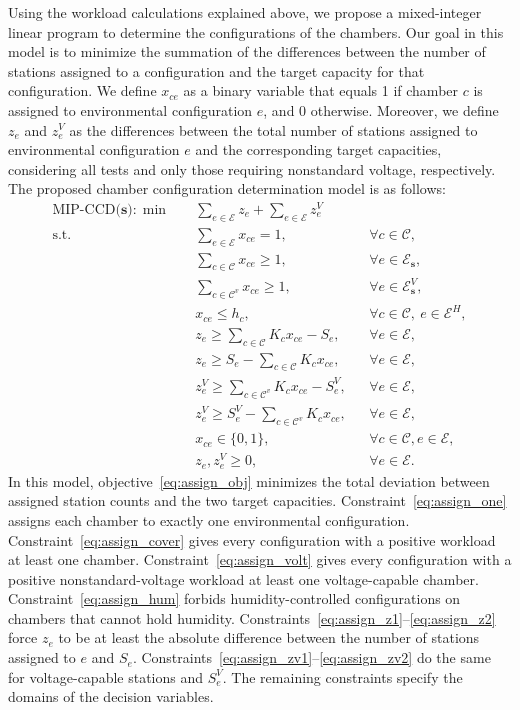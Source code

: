 \documentclass[11pt]{article}
\begin{document}
Using the workload calculations explained above, we propose a mixed-integer linear program to determine the configurations of the chambers. Our goal in this model is to minimize the summation of the differences between the number of stations assigned to a configuration and the target capacity for that configuration. We define \(x_{ce}\) as a binary variable that equals 1 if chamber \(c\) is assigned to environmental configuration \(e\), and 0 otherwise. Moreover, we define \(z_e\) and \(z_e^V\) as the differences between the total number of stations assigned to environmental configuration \(e\) and the corresponding target capacities, considering all tests and only those requiring nonstandard voltage, respectively.
The proposed chamber configuration determination model is as follows:
\begin{align}
\textrm{MIP-CCD($\mathbf{s}$)}: \min\quad
& \sum_{e\in\mathcal{E}}z_e+\sum_{e\in\mathcal{E}}z_e^V
\label{eq:assign_obj}\\
\text{s.t.}\quad
& \sum_{e\in\mathcal{E}}x_{ce}=1,
&& \forall c\in\mathcal{C},
\label{eq:assign_one}\\
& \sum_{c\in\mathcal{C}}x_{ce}\ge 1,
&& \forall e\in\mathcal{E}_\mathbf{s},
\label{eq:assign_cover}\\
& \sum_{c\in\mathcal{C}^v}x_{ce}\ge 1,
&& \forall e\in\mathcal{E}^V_\mathbf{s},
\label{eq:assign_volt}\\
& x_{ce}\le h_c,
&& \forall c\in\mathcal{C},\ e\in\mathcal{E}^H,
\label{eq:assign_hum}\\
& z_e\ge \sum_{c\in\mathcal{C}}K_cx_{ce}-S_e,
&& \forall e\in\mathcal{E},
\label{eq:assign_z1}\\
& z_e\ge S_e-\sum_{c\in\mathcal{C}}K_cx_{ce},
&& \forall e\in\mathcal{E},
\label{eq:assign_z2}\\
& z_e^V\ge \sum_{c\in\mathcal{C}^v}K_cx_{ce}-S_e^V,
&& \forall e\in\mathcal{E},
\label{eq:assign_zv1}\\
& z_e^V\ge S_e^V-\sum_{c\in\mathcal{C}^v}K_cx_{ce},
&& \forall e\in\mathcal{E},
\label{eq:assign_zv2}\\
& x_{ce}\in\{0,1\},
&& \forall c \in \mathcal{C}, e \in \mathcal{E},
\label{eq:assign_bin}\\
& z_e,z_e^V\ge 0,
&& \forall e \in \mathcal{E}.
\label{eq:assign_dom}
\end{align}
In this model, objective~\eqref{eq:assign_obj} minimizes the total deviation between assigned station counts and the two target capacities. Constraint~\eqref{eq:assign_one} assigns each chamber to exactly one environmental configuration. Constraint~\eqref{eq:assign_cover} gives every configuration with a positive workload at least one chamber. Constraint~\eqref{eq:assign_volt} gives every configuration with a positive nonstandard-voltage workload at least one voltage-capable chamber. Constraint~\eqref{eq:assign_hum} forbids humidity-controlled configurations on chambers that cannot hold humidity. Constraints~\eqref{eq:assign_z1}--\eqref{eq:assign_z2} force \(z_e\) to be at least the absolute difference between the number of stations assigned to \(e\) and \(S_e\). Constraints~\eqref{eq:assign_zv1}--\eqref{eq:assign_zv2} do the same for voltage-capable stations and \(S_e^V\). The remaining constraints specify the domains of the decision variables.
\end{document}

